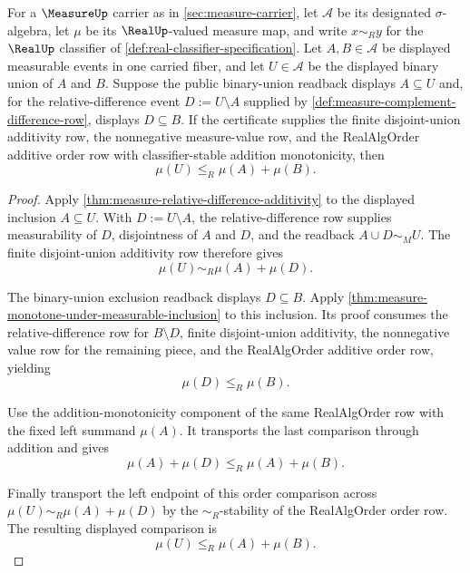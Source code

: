 \begin{theorem}
\label{thm:measure-binary-union-subadditivity}
For a $\MeasureUp$ carrier as in \autoref{sec:measure-carrier}, let
$\mathcal{A}$ be its designated $\sigma$-algebra, let $\mu$ be its
$\RealUp$-valued measure map, and write $x\sim_R y$ for the $\RealUp$
classifier of \autoref{def:real-classifier-specification}. Let
$A,B\in\mathcal{A}$ be displayed measurable events in one carried fiber, and
let $U\in\mathcal{A}$ be the displayed binary union of $A$ and $B$. Suppose
the public binary-union readback displays $A\subseteq U$ and, for the
relative-difference event $D:=U\setminus A$ supplied by
\autoref{def:measure-complement-difference-row}, displays $D\subseteq B$. If
the certificate supplies the finite disjoint-union additivity row, the
nonnegative measure-value row, and the RealAlgOrder additive order row with
classifier-stable addition monotonicity, then
$$
\mu(U)\le_R\mu(A)+\mu(B).
$$
\end{theorem}
\begin{proof}
Apply \autoref{thm:measure-relative-difference-additivity} to the displayed
inclusion $A\subseteq U$. With $D:=U\setminus A$, the relative-difference row
supplies measurability of $D$, disjointness of $A$ and $D$, and the readback
$A\cup D\sim_M U$. The finite disjoint-union additivity row therefore gives
$$
\mu(U)\sim_R\mu(A)+\mu(D).
$$

The binary-union exclusion readback displays $D\subseteq B$. Apply
\autoref{thm:measure-monotone-under-measurable-inclusion} to this inclusion.
Its proof consumes the relative-difference row for $B\setminus D$, finite
disjoint-union additivity, the nonnegative value row for the remaining piece,
and the RealAlgOrder additive order row, yielding
$$
\mu(D)\le_R\mu(B).
$$

Use the addition-monotonicity component of the same RealAlgOrder row with the
fixed left summand $\mu(A)$. It transports the last comparison through
addition and gives
$$
\mu(A)+\mu(D)\le_R\mu(A)+\mu(B).
$$

Finally transport the left endpoint of this order comparison across
$\mu(U)\sim_R\mu(A)+\mu(D)$ by the $\sim_R$-stability of the RealAlgOrder order
row. The resulting displayed comparison is
$$
\mu(U)\le_R\mu(A)+\mu(B).
$$
\end{proof}

